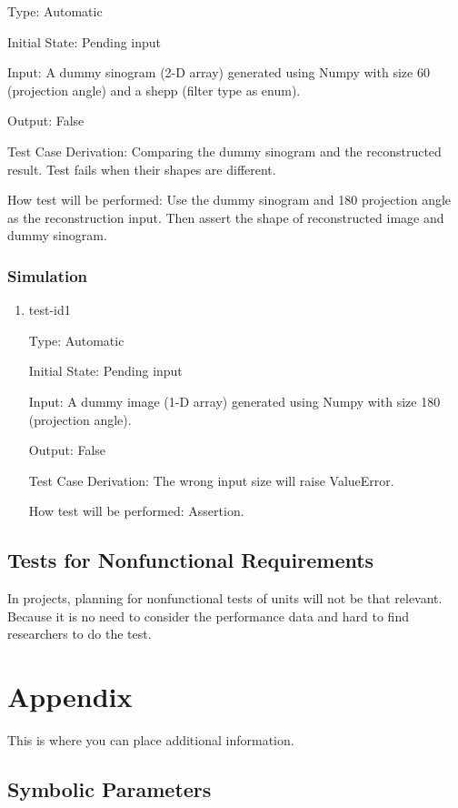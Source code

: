 \documentclass[12pt, titlepage]{article}
\begin{document}
\begin{enumerate}
Type: Automatic

Initial State: Pending input

Input: A dummy sinogram (2-D array) generated using Numpy with size 60
(projection angle) and a shepp (filter type as enum).

Output: False

Test Case Derivation: Comparing the dummy sinogram and the reconstructed result.
Test fails when their shapes are different.

How test will be performed: Use the dummy sinogram and 180 projection angle as
the reconstruction input. Then assert the shape of reconstructed image and dummy sinogram.

\end{enumerate}

\subsubsection{Simulation}
\begin{enumerate}
\item{test-id1\\}

Type: Automatic

Initial State: Pending input

Input: A dummy image (1-D array) generated using Numpy with size 180
(projection angle).

Output: False

Test Case Derivation: The wrong input size will raise ValueError.

How test will be performed: Assertion.
\end{enumerate}

\subsection{Tests for Nonfunctional Requirements}
In \progname projects, planning for nonfunctional tests of units will not be
that relevant. Because it is no need to consider the performance data and hard
to find researchers to do the test.

\newpage

\section{Appendix}

This is where you can place additional information.

\subsection{Symbolic Parameters}
\end{document}
